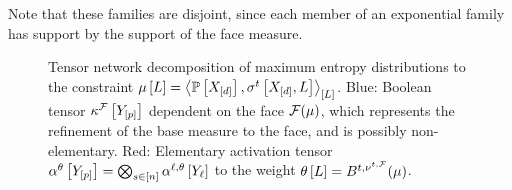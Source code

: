 Note that these families are disjoint, since each member of an exponential family has support by the support of the face measure.

\begin{figure}[t]
    \begin{center}
        
    \end{center}
    \caption{
        Tensor network decomposition of maximum entropy distributions to the constraint $\mu\left[L\right]=\left\langle \mathbb{P}\left[X_{[d]}\right],\sigma^{t}\left[X_{[d]},L\right]\right\rangle_{\left[ L \right]}$.
        Blue: Boolean tensor $\kappa^{\mathcal{F}}\left[Y_{[p]}\right]$ dependent on the face $\mathcal{F}(\mu)$, which represents the refinement of the base measure to the face, and is possibly non-elementary.
        Red: Elementary activation tensor $\alpha^\theta\left[Y_{[p]}\right]=\bigotimes_{s\in[n]}\alpha^{\ell,\theta}\left[Y_{\ell}\right]$ to the weight $\theta\left[L\right]= B^{t,\nu^{t,\mathcal{F}}}(\mu)$.
    }\label{fig:maxEntropyActcore}
\end{figure}